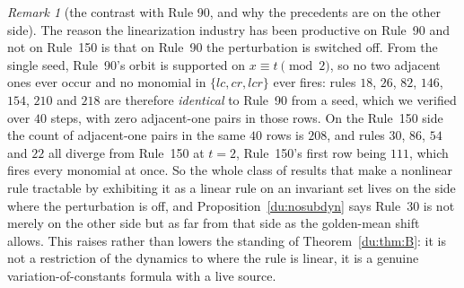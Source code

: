 \documentclass[11pt]{article}
\theoremstyle{definition}
\theoremstyle{remark}
\newtheorem{remark}[theorem]{Remark}
\begin{document}
\begin{remark}[the contrast with Rule 90, and why the precedents are on the other side]\label{du:rule90side}
The reason the linearization industry has been productive on Rule~90 and not on Rule~150 is that on
Rule~90 the perturbation is switched off. From the single seed, Rule~90's orbit is supported on
$x\equiv t\pmod 2$, so no two adjacent ones ever occur and no monomial in $\{lc,cr,lcr\}$ ever fires:
rules $18$, $26$, $82$, $146$, $154$, $210$ and $218$ are therefore \emph{identical} to Rule~90 from a
seed, which we verified over $40$ steps, with zero adjacent-one pairs in those rows. On the Rule~150
side the count of adjacent-one pairs in the same $40$ rows is $208$, and rules $30$, $86$, $54$ and
$22$ all diverge from Rule~150 at $t=2$, Rule~150's first row being $111$, which fires every monomial
at once. So the whole class of results that make a nonlinear rule tractable by exhibiting it as a
linear rule on an invariant set lives on the side where the perturbation is off, and
Proposition~\ref{du:nosubdyn} says Rule~30 is not merely on the other side but as far from that side as
the golden-mean shift allows. This raises rather than lowers the standing of Theorem~\ref{du:thm:B}: it
is not a restriction of the dynamics to where the rule is linear, it is a genuine variation-of-constants
formula with a live source.
\end{remark}
\end{document}
